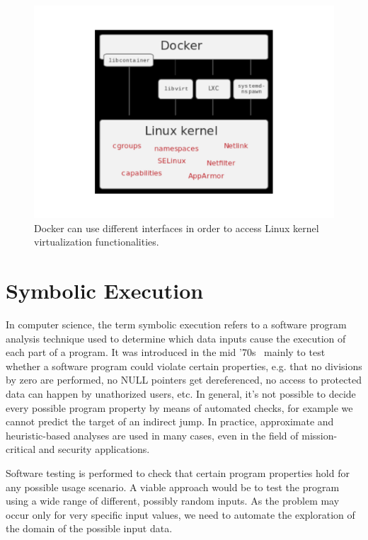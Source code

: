 \begin{figure}
	\centering
	\includegraphics[width=\columnwidth]{Images/docker.pdf}  
	\caption[Docker Interfaces]{Docker can use different interfaces in order to access Linux kernel virtualization functionalities.}
	\label{fig:docker}
\end{figure}

\section{Symbolic Execution}
In computer science, the term symbolic execution refers to a software program analysis technique used to determine which data inputs cause the execution of each part of a program. It was introduced in the mid '70s~\cite{K-ICRS75,SELECT-ICRS75,K-CACM76,H-TSE77} mainly to test whether a software program could violate certain properties, e.g. that no divisions by zero are performed, no NULL pointers get dereferenced, no access to protected data can happen by unathorized users, etc. In general, it's not possible to decide every possible program property by means of automated checks, for example we cannot predict the target of an indirect jump. %
In practice, approximate and heuristic-based analyses are used in many cases, even in the field of mission-critical and security applications.

Software testing is performed to check that certain program properties hold for any possible usage scenario. A viable approach would be to test the program using a wide range of different, possibly random inputs. As the problem may occur only for very specific input values, we need to automate the exploration of the domain of the possible input data. 

